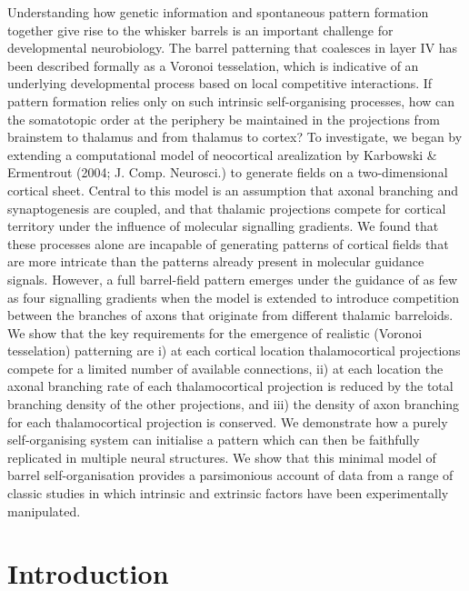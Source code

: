 \documentclass[a4paper,11pt]{article}
\begin{document}
Understanding how genetic information and spontaneous pattern formation together give rise to the whisker barrels is an important challenge for developmental neurobiology. The barrel patterning that coalesces in layer IV has been described formally as a Voronoi tesselation, which is indicative of an underlying developmental process based on local competitive interactions. If pattern formation relies only on such intrinsic self-organising processes, how can the somatotopic order at the periphery be maintained in the projections from brainstem to thalamus and from thalamus to cortex? To investigate, we began by extending a computational model of neocortical arealization by Karbowski \& Ermentrout (2004; J. Comp. Neurosci.) to generate fields on a two-dimensional cortical sheet. Central to this model is an assumption that axonal branching and synaptogenesis are coupled, and that thalamic projections compete for cortical territory under the influence of molecular signalling gradients. We found that these processes alone are incapable of generating patterns of cortical fields that are more intricate than the patterns already present in molecular guidance signals. However, a full barrel-field pattern emerges under the guidance of as few as four signalling gradients when the model is extended to introduce competition between the branches of axons that originate from different thalamic barreloids. We show that the key requirements for the emergence of realistic (Voronoi tesselation) patterning are i) at each cortical location thalamocortical projections compete for a limited number of available connections, ii) at each location the axonal branching rate of each thalamocortical projection is reduced by the total branching density of the other projections, and iii) the density of axon branching for each thalamocortical projection is conserved. We demonstrate how a purely self-organising system can initialise a pattern which can then be faithfully replicated in multiple neural structures. We show that this minimal model of barrel self-organisation provides a parsimonious account of data from a range of classic studies in which intrinsic and extrinsic factors have been experimentally manipulated.


\section*{Introduction}

\modulolinenumbers{}
\linenumbers
\end{document}
